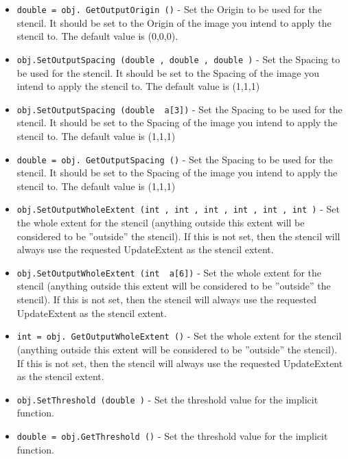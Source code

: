 \begin{itemize}
\item  \verb|double = obj. GetOutputOrigin ()| -  Set the Origin to be used for the stencil.  It should be
 set to the Origin of the image you intend to apply the
 stencil to. The default value is (0,0,0).

\item  \verb|obj.SetOutputSpacing (double , double , double )| -  Set the Spacing to be used for the stencil. It should be
 set to the Spacing of the image you intend to apply the
 stencil to. The default value is (1,1,1)

\item  \verb|obj.SetOutputSpacing (double  a[3])| -  Set the Spacing to be used for the stencil. It should be
 set to the Spacing of the image you intend to apply the
 stencil to. The default value is (1,1,1)

\item  \verb|double = obj. GetOutputSpacing ()| -  Set the Spacing to be used for the stencil. It should be
 set to the Spacing of the image you intend to apply the
 stencil to. The default value is (1,1,1)

\item  \verb|obj.SetOutputWholeExtent (int , int , int , int , int , int )| -  Set the whole extent for the stencil (anything outside
 this extent will be considered to be ''outside'' the stencil).
 If this is not set, then the stencil will always use
 the requested UpdateExtent as the stencil extent.

\item  \verb|obj.SetOutputWholeExtent (int  a[6])| -  Set the whole extent for the stencil (anything outside
 this extent will be considered to be ''outside'' the stencil).
 If this is not set, then the stencil will always use
 the requested UpdateExtent as the stencil extent.

\item  \verb|int = obj. GetOutputWholeExtent ()| -  Set the whole extent for the stencil (anything outside
 this extent will be considered to be ''outside'' the stencil).
 If this is not set, then the stencil will always use
 the requested UpdateExtent as the stencil extent.

\item  \verb|obj.SetThreshold (double )| -  Set the threshold value for the implicit function.

\item  \verb|double = obj.GetThreshold ()| -  Set the threshold value for the implicit function.

\end{itemize}
